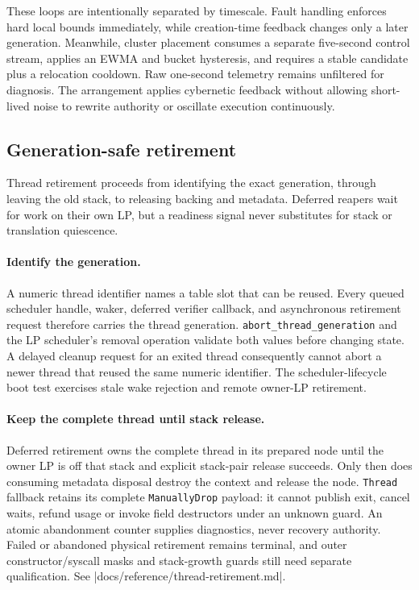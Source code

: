 These loops are intentionally separated by timescale. Fault handling enforces
hard local bounds immediately, while creation-time feedback changes only a later
generation. Meanwhile, cluster placement consumes a separate five-second control stream,
applies an EWMA and bucket hysteresis, and requires a stable candidate plus a
relocation cooldown. Raw one-second telemetry remains unfiltered for diagnosis.
The arrangement applies cybernetic feedback without allowing short-lived noise
to rewrite authority or oscillate execution continuously.

\subsection{Generation-safe retirement}

Thread retirement proceeds from identifying the exact generation, through
leaving the old stack, to releasing backing and metadata. Deferred reapers wait
for work on their own LP, but a readiness signal never substitutes for stack or
translation quiescence.

\paragraph*{Identify the generation.}

A numeric thread identifier names a table slot that can be reused. Every queued
scheduler handle, waker, deferred verifier callback, and
asynchronous retirement request therefore carries the thread generation.
\texttt{abort\_thread\_generation} and the LP scheduler's removal operation
validate both values before changing state. A delayed cleanup request for an
exited thread consequently cannot abort a newer thread that reused the same
numeric identifier. The scheduler-lifecycle boot test exercises stale wake
rejection and remote owner-LP retirement.

\paragraph*{Keep the complete thread until stack release.}

Deferred retirement owns the complete thread in its prepared node until the
owner LP is off that stack and explicit stack-pair release succeeds. Only then
does consuming metadata disposal destroy the context and release the node.
\texttt{Thread} fallback retains its complete \texttt{ManuallyDrop} payload:
it cannot publish exit, cancel waits, refund usage or invoke field destructors
under an unknown guard. An atomic abandonment counter supplies diagnostics,
never recovery authority. Failed or abandoned physical retirement remains
terminal, and outer constructor/syscall masks and stack-growth guards still need
separate qualification. See \repofile|docs/reference/thread-retirement.md|.


